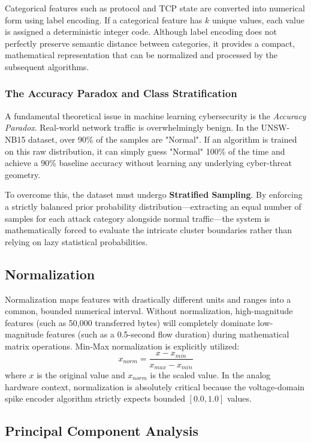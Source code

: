 \documentclass{ieeeaccess}
\begin{document}
Categorical features such as protocol and TCP state are converted into numerical form using label encoding. If a categorical feature has $k$ unique values, each value is assigned a deterministic integer code. Although label encoding does not perfectly preserve semantic distance between categories, it provides a compact, mathematical representation that can be normalized and processed by the subsequent algorithms.

\subsubsection{The Accuracy Paradox and Class Stratification}
A fundamental theoretical issue in machine learning cybersecurity is the \textit{Accuracy Paradox}. Real-world network traffic is overwhelmingly benign. In the UNSW-NB15 dataset, over 90\% of the samples are "Normal". If an algorithm is trained on this raw distribution, it can simply guess "Normal" 100\% of the time and achieve a 90\% baseline accuracy without learning any underlying cyber-threat geometry.

To overcome this, the dataset must undergo \textbf{Stratified Sampling}. By enforcing a strictly balanced prior probability distribution—extracting an equal number of samples for each attack category alongside normal traffic—the system is mathematically forced to evaluate the intricate cluster boundaries rather than relying on lazy statistical probabilities.

\subsection{Normalization}

Normalization maps features with drastically different units and ranges into a common, bounded numerical interval. Without normalization, high-magnitude features (such as 50,000 transferred bytes) will completely dominate low-magnitude features (such as a 0.5-second flow duration) during mathematical matrix operations. Min-Max normalization is explicitly utilized:
\begin{equation}
x_{norm} = \frac{x - x_{min}}{x_{max} - x_{min}}
\end{equation}
where $x$ is the original value and $x_{norm}$ is the scaled value. In the analog hardware context, normalization is absolutely critical because the voltage-domain spike encoder algorithm strictly expects bounded $[0.0, 1.0]$ values.

\subsection{Principal Component Analysis}
\end{document}
